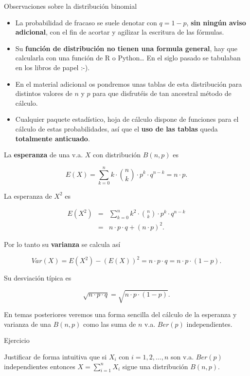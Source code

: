 \documentclass[
  letterpaper,
  DIV=11,
  numbers=noendperiod]{scrreprt}
\providecommand{\tightlist}{%
  \setlength{\itemsep}{0pt}\setlength{\parskip}{0pt}}\usepackage{longtable,booktabs,array}
\begin{document}
\begin{Nota}{Observaciones sobre la distribución binomial}{}

\begin{itemize}
\tightlist
\item
  La probabilidad de fracaso se suele denotar con \(q=1-p\), \textbf{sin
  ningún aviso adicional}, con el fin de acortar y agilizar la escritura
  de las fórmulas.
\item
  Su \textbf{función de distribución no tienen una formula general}, hay
  que calcularla con una función de R o Python\ldots{} En el siglo
  pasado se tabulaban en los libros de papel :-).
\item
  En el material adicional os pondremos unas tablas de esta distribución
  para distintos valores de \(n\) y \(p\) para que disfrutéis de tan
  ancestral método de cálculo.
\item
  Cualquier paquete estadístico, hoja de cálculo dispone de funciones
  para el cálculo de estas probabilidades, así que el \textbf{uso de las
  tablas} queda \textbf{totalmente anticuado}.
\end{itemize}

\end{Nota}

La \textbf{esperanza} de una v.a. \(X\) con distribución \(B(n,p)\) es

\[E(X)=\displaystyle\sum_{k=0}^n k \cdot {n \choose k }\cdot p^k\cdot q^{n-k} = n\cdot p.\]

La esperanza de \(X^2\) es

\begin{eqnarray*}
E(X^2)&=& \displaystyle\sum_{k=0}^n k^2 \cdot {n \choose k }\cdot p^k\cdot q^{n-k}\\
&=& n\cdot p\cdot q+(n\cdot p)^2.
\end{eqnarray*}

Por lo tanto su \textbf{varianza} se calcula así

\[Var(X)=E(X^2)-\left(E(X)\right)^2=n\cdot p \cdot q=n\cdot p\cdot (1-p).\]

Su desviación típica es

\[\sqrt{n\cdot p\cdot q}=\sqrt{n\cdot p\cdot (1-p)}.\]

En temas posteriores veremos una forma sencilla del cálculo de la
esperanza y varianza de una \(B(n,p)\) como las suma de \(n\) v.a.
\(Ber(p)\) independientes.

\begin{Ejercicio}{Ejercicio}{}

Justificar de forma intuitiva que si \(X_i\) con \(i=1,2,\ldots, n\) son
v.a. \(Ber(p)\) independientes entonces
\(X=\displaystyle\sum_{i=1}^n X_i\) sigue una distribución \(B(n,p).\)

\end{Ejercicio}
\end{document}
